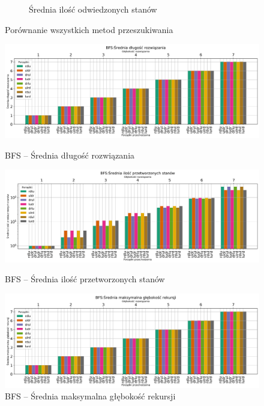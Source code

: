 \documentclass{classrep}
\begin{document}
\begin{figure}[H]
\begin{subfigure}[t]{0.45\textwidth}
        \caption{Średnia ilość odwiedzonych stanów}
        \label{ASTR:visited}
    \end{subfigure}
    \caption{Porównanie wszystkich metod przeszukiwania}\label{coll:astr}
\end{figure}

\begin{figure}[H]
    \includegraphics[width=\textwidth]{charts/BFS_path_length.png}
    \caption{BFS -- Średnia długość rozwiązania}
    \label{BFS:path_length}
    \vspace{0.2cm}
    \includegraphics[width=\textwidth]{charts/BFS_processed.png}
    \caption{BFS -- Średnia ilość przetworzonych stanów}
    \label{BFS:processed}
    \vspace{0.2cm}
    \includegraphics[width=\textwidth]{charts/BFS_recursed.png}
    \caption{BFS --  Średnia maksymalna głębokość rekursji}
    \label{BFS:recursed}

\end{figure}
\end{document}
